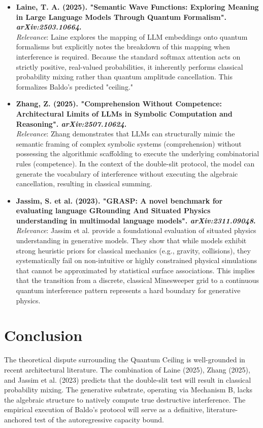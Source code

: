 \documentclass[12pt]{article}
\begin{document}
\begin{itemize}
    \item \textbf{Laine, T. A. (2025). "Semantic Wave Functions: Exploring Meaning in Large Language Models Through Quantum Formalism". \textit{arXiv:2503.10664}.} \\
    \textit{Relevance}: Laine explores the mapping of LLM embeddings onto quantum formalisms but explicitly notes the breakdown of this mapping when interference is required. Because the standard softmax attention acts on strictly positive, real-valued probabilities, it inherently performs classical probability mixing rather than quantum amplitude cancellation. This formalizes Baldo's predicted "ceiling."
    \item \textbf{Zhang, Z. (2025). "Comprehension Without Competence: Architectural Limits of LLMs in Symbolic Computation and Reasoning". \textit{arXiv:2507.10624}.} \\
    \textit{Relevance}: Zhang demonstrates that LLMs can structurally mimic the semantic framing of complex symbolic systems (comprehension) without possessing the algorithmic scaffolding to execute the underlying combinatorial rules (competence). In the context of the double-slit protocol, the model can generate the vocabulary of interference without executing the algebraic cancellation, resulting in classical summing.
    \item \textbf{Jassim, S. et al. (2023). "GRASP: A novel benchmark for evaluating language GRounding And Situated Physics understanding in multimodal language models". \textit{arXiv:2311.09048}.} \\
    \textit{Relevance}: Jassim et al. provide a foundational evaluation of situated physics understanding in generative models. They show that while models exhibit strong heuristic priors for classical mechanics (e.g., gravity, collisions), they systematically fail on non-intuitive or highly constrained physical simulations that cannot be approximated by statistical surface associations. This implies that the transition from a discrete, classical Minesweeper grid to a continuous quantum interference pattern represents a hard boundary for generative physics.
\end{itemize}

\section{Conclusion}
The theoretical dispute surrounding the Quantum Ceiling is well-grounded in recent architectural literature. The combination of Laine (2025), Zhang (2025), and Jassim et al. (2023) predicts that the double-slit test will result in classical probability mixing. The generative substrate, operating via Mechanism B, lacks the algebraic structure to natively compute true destructive interference. The empirical execution of Baldo's protocol will serve as a definitive, literature-anchored test of the autoregressive capacity bound.
\end{document}
